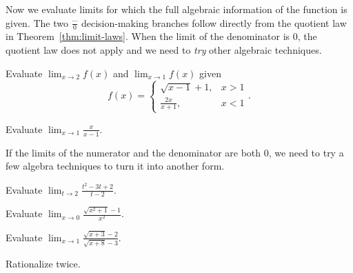 \documentclass[../main.tex]{subfiles}
\begin{document}
\begin{sidefigure}{
    
  }
  Now we evaluate limits for which the full algebraic information of the function is given. The two \(\frac{\cdots}{0}\) decision-making branches follow directly from the quotient law in Theorem~\ref{thm:limit-laws}. When the limit of the denominator is \(0\), the quotient law does not apply and we need to \emph{try} other algebraic techniques. \label{page:mindmap-limits-direct-substitution}
\end{sidefigure}

\begin{example} \label{eg:limit-piecewise}
  Evaluate \(\lim_{x \to 2} f(x)\) and \(\lim_{x \to 1} f(x)\) given
  \[
    f(x) =
    \begin{cases}
      \sqrt{x - 1} + 1, &x > 1\\[1ex]
      \frac{2x}{x + 1}, &x < 1
    \end{cases}.
  \]

\end{example}

\begin{example} \label{eg:limit-constant-over-0}
  Evaluate \(\lim_{x \to 1} \frac{x}{x - 1}\).

\end{example}

\clearpage
\begin{sidefigure}{
    
  }
  If the limits of the numerator and the denominator are both \(0\), we need to try a few algebra techniques to turn it into another form. \label{page:mindmap-limits-zero-over-zero}
\end{sidefigure}

\begin{example} \label{eg:limit-cancellation}
  Evaluate \(\lim_{t \to 2} \frac{t^{2} - 3t + 2}{t - 2}\).

  \blanks*
\end{example}

\begin{example} \label{eg:limit-rationalization}
  Evaluate \(\lim_{x \to 0} \frac{\sqrt{x^{2}+1}-1}{x^{2}}\).

  \blanks*
\end{example}
\clearpage

\begin{exercise} \label{ex:limit-rationalization-2}
  Evaluate \(\lim_{x \to 1} \frac{\sqrt{x + 3}-2}{\sqrt{x + 8} - 3}\).

  {\footnotesize Rationalize twice.}

  \blanks*
\end{exercise}
\end{document}

